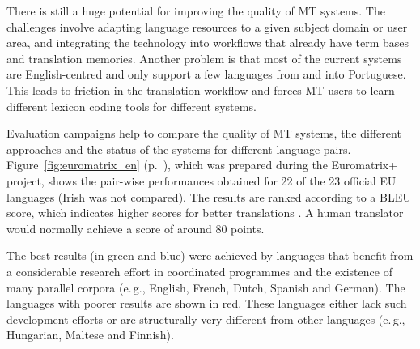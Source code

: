 \begin{multicols}{2}
There is still a huge potential for improving the quality of MT systems. The challenges involve adapting language resources to a given subject domain or user area, and integrating the technology into workflows that already have term bases and translation memories. Another problem is that most of the current systems are English-centred and only support a few languages from and into Portuguese. This leads to friction in the translation workflow and forces MT users to learn different lexicon coding tools for different systems.

Evaluation campaigns help to compare the quality of MT systems, the different approaches and the status of the systems for different language pairs. Figure~\ref{fig:euromatrix_en} (p.~\pageref{fig:euromatrix_en}), which was prepared during the Euromatrix+ project, shows the pair-wise performances obtained for 22 of the 23 official EU languages (Irish was not compared). The results are ranked according to a BLEU score, which indicates higher scores for better translations \cite{bleu1}. A human translator would normally achieve a score of around 80 points.

The best results (in green and blue) were achieved by languages that benefit from a considerable research effort in coordinated programmes and the existence of many parallel corpora (e.\,g., English, French, Dutch, Spanish and German). The languages with poorer results are shown in red. These languages either lack such development efforts or are structurally very different from other languages (e.\,g., Hungarian, Maltese and Finnish).


\end{multicols}
